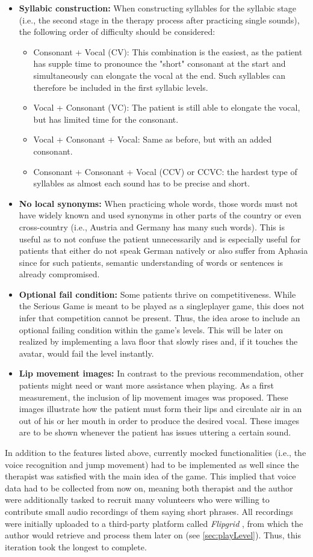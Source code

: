 \documentclass[draft,final]{vutinfth} %
\begin{document}
\begin{itemize}
\item \textbf{Syllabic construction:} When constructing syllables for the syllabic stage (i.e., the second stage in the therapy process after practicing single sounds), the following order of difficulty should be considered:
\begin{itemize}
\item Consonant + Vocal (CV): This combination is the easiest, as the patient has supple time to pronounce the "short" consonant at the start and simultaneously can elongate the vocal at the end. Such syllables can therefore be included in the first syllabic levels.
\item Vocal + Consonant (VC): The patient is still able to elongate the vocal, but has limited time for the consonant.
\item Vocal + Consonant + Vocal: Same as before, but with an added consonant.
\item Consonant + Consonant + Vocal (CCV) or CCVC: the hardest type of syllables as almost each sound has to be precise and short.
\end{itemize}
\item \textbf{No local synonyms:} When practicing whole words, those words must not have widely known and used synonyms in other parts of the country or even cross-country (i.e., Austria and Germany has many such words). This is useful as to not confuse the patient unnecessarily and is especially useful for patients that either do not speak German natively or also suffer from Aphasia since for such patients, semantic understanding of words or sentences is already compromised.
\item \textbf{Optional fail condition:} Some patients thrive on competitiveness. While the Serious Game is meant to be played as a singleplayer game, this does not infer that competition cannot be present. Thus, the idea arose to include an optional failing condition within the game's levels. This will be later on realized by implementing a lava floor that slowly rises and, if it touches the avatar, would fail the level instantly.  
\item \textbf{Lip movement images:} In contrast to the previous recommendation, other patients might need or want more assistance when playing. As a first measurement, the inclusion of lip movement images was proposed. These images illustrate how the patient must form their lips and circulate air in an out of his or her mouth in order to produce the desired vocal. These images are to be shown whenever the patient has issues uttering a certain sound.
\end{itemize}
In addition to the features listed above, currently mocked functionalities (i.e., the voice recognition and jump movement) had to be implemented as well since the therapist was satisfied with the main idea of the game. This implied that voice data had to be collected from now on, meaning both therapist and the author were additionally tasked to recruit many volunteers who were willing to contribute small audio recordings of them saying short phrases. All recordings were initially uploaded to a third-party platform called \emph{Flipgrid} \cite{Flip}, from which the author would retrieve and process them later on (see \ref{sec:playLevel}). Thus, this iteration took the longest to complete.
\end{document}

